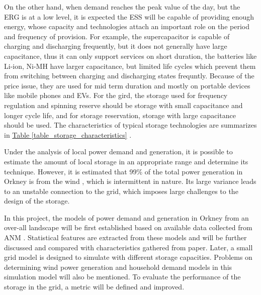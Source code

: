 \documentclass[12pt,a4paper]{report}
\begin{document}
        On the other hand, when demand reaches the peak value of the day, but the ERG is at a low level, 
        it is expected the ESS will be capable of providing enough energy, whose capacity and technologies attach an important role on the period and frequency
        of provision. For example, the supercapacitor is capable of charging and discharging frequently, but it does not
        generally have large capacitance, thus it can only support services on short duration, the batteries like Li-ion, Ni-MH
        have larger capacitance, but limited life cycles which prevent them from switching between charging and discharging states
        frequntly. Because of the price issue, they are used for mid term duration and mostly on portable devices like mobile phones and
        EVs. For the gird, the storage used for frequency regulation and spinning reserve should be storage with small capacitance and longer cycle life, and for storage reservation, storage with large capacitance should be used.
        The characteristics of typical storage technologies are summarizes in \hyperref[table_storage_characteristics]{Table \ref*{table_storage_characteristics}} \cite{paper:Barton2004} \cite{paper:Vazquez2010}.
        
        Under the analysis of local power demand and generation, it is possible to estimate the amount of local storage in an appropriate range and determine its technique. 
        However, it is estimated that 99\% of the total power generation in Orkney is from the wind \cite{report:OrkneyAudit}, 
        which is intermittent in nature. Its large variance leads to an unstable connection to the grid, 
        which imposes large challenges to the design of the storage.

        In this project, the models of power demand and generation in Orkney from an over-all landscape will be first established based on available data collected from ANM \cite{website:ANM}. 
        Statistical features are extracted from these models and will be further discussed and compared with characteristics gathered from paper. 
        Later, a small grid model is designed to simulate with different storage capacities. 
        Problems on determining wind power generation and household demand models in this simulation model will also be mentioned. 
        To evaluate the performance of the storage in the grid, a metric will be defined and improved.
\end{document}
